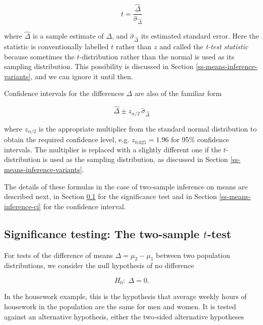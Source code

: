 \documentclass[11pt,a4paper,openany]{book}
\begin{document}
\begin{equation}t=\frac{\hat{\Delta}}{\hat{\sigma}_{\hat{\Delta}}}
\label{eq:tma}\end{equation}

where \(\hat{\Delta}\) is a sample estimate of \(\Delta\), and
\(\hat{\sigma}_{\hat{\Delta}}\) its estimated standard error. Here the
statistic is conventionally labelled \(t\) rather than \(z\) and called
the \emph{t-test statistic} because sometimes the \(t\)-distribution
rather than the normal is used as its sampling distribution. This
possibility is discussed in Section \ref{ss-means-inference-variants},
and we can ignore it until then.

Confidence intervals for the differences \(\Delta\) are also of the
familiar form

\begin{equation}\hat{\Delta} \pm z_{\alpha/2}\, \hat{\sigma}_{\hat{\Delta}}
\label{eq:ciDpa}\end{equation}

where \(z_{\alpha/2}\) is the appropriate multiplier from the standard
normal distribution to obtain the required confidence level, e.g.
\(z_{0.025}=1.96\) for 95\% confidence intervals. The multiplier is
replaced with a slightly different one if the \(t\)-distribution is used
as the sampling distribution, as discussed in Section
\ref{ss-means-inference-variants}.

The details of these formulas in the case of two-sample inference on
means are described next, in Section \ref{ss-means-inference-test} for
the significance test and in Section \ref{ss-means-inference-ci} for the
confidence interval.

\subsection{\texorpdfstring{Significance testing: The two-sample
\(t\)-test}{Significance testing: The two-sample t-test}}\label{ss-means-inference-test}

For tests of the difference of means \(\Delta=\mu_{2}-\mu_{1}\) between
two population distributions, we consider the null hypothesis of no
difference

\begin{equation}H_{0}: \; \Delta=0.
\label{eq:H0m}\end{equation}

In the housework example, this is the hypothesis that average weekly
hours of housework in the population are the same for men and women. It
is tested against an alternative hypothesis, either the two-sided
alternative hypotheses
\end{document}
